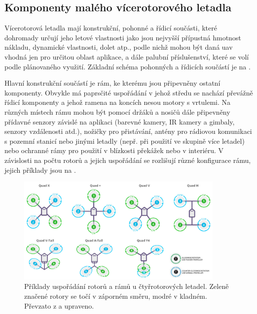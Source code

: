 \subsection{Komponenty malého vícerotorového letadla}
Vícerotorová letadla mají konstrukční, pohonné a řídicí součásti, které dohromady určují jeho letové vlastnosti jako jsou nejvyšší přípustná hmotnost nákladu, dynamické vlastnosti, dolet atp., podle nichž mohou být daná \acrshort{uav} vhodná jen pro určitou oblast aplikace, a dále palubní příslušenství, které se volí podle plánovaného využití. Základní schéma pohonných a řídicích součástí je na .

Hlavní konstrukční součástí je rám, ke kterému jsou připevněny ostatní komponenty. Obvykle má paprsčité uspořádání v jehož středu se nachází převážně řídicí komponenty a jehož ramena na koncích nesou motory s vrtulemi. Na různých místech rámu mohou být pomocí držáků a nosičů dále připevněny přídavné senzory závislé na aplikaci (barevné kamery, IR kamery a gimbaly, senzory vzdálenosti atd.), nožičky pro přistávání, antény pro rádiovou komunikaci s pozemní stanicí nebo jinými letadly (nepř. při použití ve skupině více letadel) nebo ochranné rámy pro použití v blízkosti překážek nebo v interiéru. V závislosti na počtu rotorů a jejich uspořádání se rozlišují různé konfigurace rámu, jejich příklady jsou na .
\begin{figure}
    \centering
    \includegraphics[width=0.9\textwidth]{img/intro/konfigurace.jpg}
    \caption[Uspořádání rotorů rámů u čtyřrotorových letadel]{Příklady uspořádání rotorů a rámů u čtyřrotorových letadel. Zeleně značené rotory se točí v záporném směru, modré v kladném. Převzato z \cite{ardupilot} a upraveno.}
    \label{fig:konfigurace}
\end{figure}

